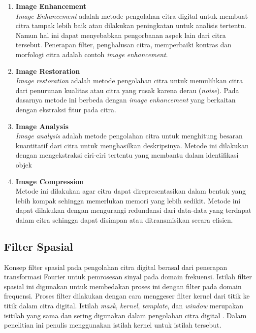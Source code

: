 \begin{enumerate} [label=\textbf{\alph*.}]
    \item \textbf{Image Enhancement} \\ 
    \textit{Image Enhancement} adalah metode pengolahan citra digital untuk membuat citra tampak lebih baik atau dilakukan peningkatan untuk analisis tertentu. Namun hal ini dapat menyebabkan pengorbanan aspek lain dari citra tersebut. Penerapan filter, penghalusan citra, memperbaiki kontras dan morfologi citra adalah contoh \textit{image enhancement}. 
    \item \textbf{Image Restoration} \\ 
    \textit{Image restoration} adalah metode pengolahan citra untuk memulihkan citra dari penurunan kualitas atau citra yang rusak karena derau (\textit{noise}). Pada dasarnya metode ini berbeda dengan \textit{image enhancement} yang berkaitan dengan ekstraksi fitur pada citra. 
    \item \textbf{Image Analysis} \\ 
    \textit{Image analysis} adalah metode pengolahan citra untuk menghitung besaran kuantitatif dari citra untuk menghasilkan deskripsinya. Metode ini dilakukan dengan mengekstraksi ciri-ciri tertentu yang membantu dalam identifikasi objek
    \item \textbf{Image Compression} \\ 
    Metode ini dilakukan agar citra dapat direpresentasikan dalam bentuk yang lebih kompak sehingga memerlukan memori yang lebih sedikit. Metode ini dapat dilakukan dengan mengurangi redundansi dari data-data yang terdapat dalam citra sehingga dapat disimpan atau ditransmisikan secara efisien.
\end{enumerate}

\subsection{Filter Spasial}
Konsep filter spasial pada pengolahan citra digital berasal dari penerapan transformasi Fourier untuk pemrosesan sinyal pada domain frekuensi. Istilah filter spasial ini digunakan untuk membedakan proses ini dengan filter pada domain frequensi. Proses filter dilakukan dengan cara menggeser filter kernel dari titik ke titik dalam citra digital. Istilah \textit{mask}, \textit{kernel}, \textit{template}, dan \textit{window} merupakan isitilah yang sama dan sering digunakan dalam pengolahan citra digital . Dalam penelitian ini penulis menggunakan istilah kernel untuk istilah tersebut.

